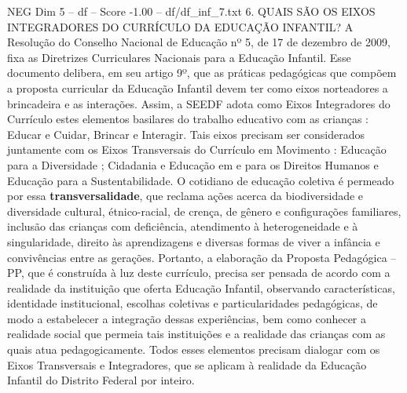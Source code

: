 \begin{textsample}{NEG Dim 5 – df – Score -1.00 – df/df\_inf\_7.txt}  \label{ex:f5_neg_135}
6.
QUAIS SÃO OS EIXOS INTEGRADORES DO CURRÍCULO DA EDUCAÇÃO INFANTIL?
A Resolução do Conselho Nacional de Educação nº 5, de 17 de dezembro de 2009, fixa as Diretrizes Curriculares Nacionais para a Educação Infantil.
Esse documento delibera, em seu artigo 9º, que as práticas pedagógicas que compõem a proposta curricular da Educação Infantil devem ter como eixos norteadores a brincadeira e as interações.
Assim, a SEEDF adota como Eixos Integradores do Currículo estes elementos basilares do trabalho educativo com as crianças : Educar e Cuidar, Brincar e Interagir.
Tais eixos precisam ser considerados juntamente com os Eixos Transversais do Currículo em Movimento : Educação para a Diversidade ; Cidadania e Educação em e para os Direitos Humanos e Educação para a Sustentabilidade.
O cotidiano de educação coletiva é permeado por essa \textbf{transversalidade}, que reclama ações acerca da biodiversidade e diversidade cultural, étnico-racial, de crença, de gênero e configurações familiares, inclusão das crianças com deficiência, atendimento à heterogeneidade e à singularidade, direito às aprendizagens e diversas formas de viver a infância e convivências entre as gerações.
Portanto, a elaboração da Proposta Pedagógica – PP, que é construída à luz deste currículo, precisa ser pensada de acordo com a realidade da instituição que oferta Educação Infantil, observando características, identidade institucional, escolhas coletivas e particularidades pedagógicas, de modo a estabelecer a integração dessas experiências, bem como conhecer a realidade social que permeia tais instituições e a realidade das crianças com as quais atua pedagogicamente.
Todos esses elementos precisam dialogar com os Eixos Transversais e Integradores, que se aplicam à realidade da Educação Infantil do Distrito Federal por inteiro.

\end{textsample}
